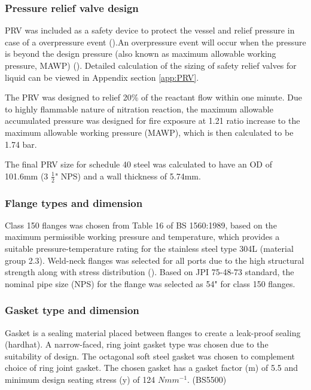 \subsubsection{Pressure relief valve design}
PRV was included as a safety device to protect the vessel and relief pressure in case of a overpressure event ().An overpressure event will occur when the pressure is beyond the design pressure (also known as maximum allowable working pressure, MAWP) (). Detailed calculation of the sizing of safety relief valves for liquid can be viewed in Appendix section \ref{app:PRV}.

The PRV was designed to relief 20\% of the reactant flow within one minute. Due to highly flammable nature of nitration reaction, the maximum allowable accumulated pressure was designed for fire exposure at 1.21 ratio increase to the maximum allowable working pressure (MAWP), which is then calculated to be 1.74 bar. 

The final PRV size for schedule 40 steel was calculated to have an OD of 101.6mm (3 $\frac{1}{2}$" NPS) and a wall thickness of 5.74mm.



\subsubsection{Flange types and dimension}
Class 150 flanges was chosen from Table 16 of BS 1560:1989, based on the maximum permissible working pressure and temperature, which provides a suitable pressure-temperature rating for the stainless steel type 304L (material group 2.3). Weld-neck flanges was selected for all ports due to the high structural strength along with stress distribution ().
Based on JPI 75-48-73 standard, the nominal pipe size (NPS) for the flange was selected as 54" for class 150 flanges.
\subsubsection{Gasket type and dimension}
Gasket is a sealing material placed between flanges to create a leak-proof sealing (hardhat). A narrow-faced, ring joint gasket type was chosen due to the suitability of design. The octagonal soft steel gasket was chosen to complement choice of ring joint gasket. The chosen gasket has a gasket factor (m) of 5.5 and minimum design seating stress (y) of 124 $Nmm^{-1}$. (BS5500)

